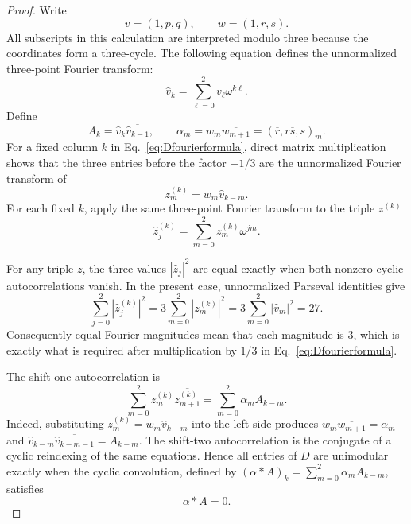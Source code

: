 \begin{proof}
Write
\begin{equation}
v=(1,p,q),\qquad w=(1,r,s).
\label{eq:vwhat}
\end{equation}
All subscripts in this calculation are interpreted modulo three because the coordinates form a three-cycle.  The following equation defines the unnormalized three-point Fourier transform:
\begin{equation}
\widehat v_k=\sum_{\ell=0}^{2}v_{\ell}\omega^{k\ell}.
\label{eq:vhat-transform}
\end{equation}
Define
\begin{equation}
A_k=\widehat v_k\overline{\widehat v_{k-1}},
\qquad
\alpha_m=w_m\overline{w_{m+1}}
=(\overline r,r\overline s,s)_m.
\label{eq:Aalpha}
\end{equation}
For a fixed column $k$ in Eq.~\eqref{eq:Dfourierformula}, direct matrix multiplication shows that the three entries before the factor $-1/3$ are the unnormalized Fourier transform of
\begin{equation}
z_m^{(k)}=w_m\widehat v_{k-m}.
\label{eq:zk}
\end{equation}
{For each fixed $k$, apply the same three-point Fourier transform to the triple $z^{(k)}$}
\begin{equation}
{\widehat z_j^{(k)}=\sum_{m=0}^{2}z_m^{(k)}\omega^{jm}.}
\label{eq:zhat-transform}
\end{equation}

For any triple $z$, the three values $|\widehat z_j|^2$ are equal exactly when both nonzero cyclic autocorrelations vanish.  In the present case, unnormalized Parseval identities give
\begin{equation}
\sum_{j=0}^{2}|\widehat z_j^{(k)}|^2
=3\sum_{m=0}^{2}|z_m^{(k)}|^2
=3\sum_{m=0}^{2}|\widehat v_m|^2=27.
\label{eq:parseval27}
\end{equation}
Consequently equal Fourier magnitudes mean that each magnitude is $3$, which is exactly what is required after multiplication by $1/3$ in Eq.~\eqref{eq:Dfourierformula}.

The shift-one autocorrelation is
\begin{equation}
\sum_{m=0}^{2}z_m^{(k)}\overline{z_{m+1}^{(k)}}
=\sum_{m=0}^{2}\alpha_m A_{k-m}.
\label{eq:autoconvolution}
\end{equation}
Indeed, substituting $z_m^{(k)}=w_m\widehat v_{k-m}$ into the left side produces $w_m\overline{w_{m+1}}=\alpha_m$ and $\widehat v_{k-m}\overline{\widehat v_{k-m-1}}=A_{k-m}$. The shift-two autocorrelation is the conjugate of a cyclic reindexing of the same equations.  Hence all entries of $D$ are unimodular exactly when the cyclic convolution, defined by $(\alpha*A)_k=\sum_{m=0}^{2}\alpha_mA_{k-m}$, satisfies
\begin{equation}
\alpha*A=0.
\label{eq:alphaconvolutionA}
\end{equation}


\end{proof}
